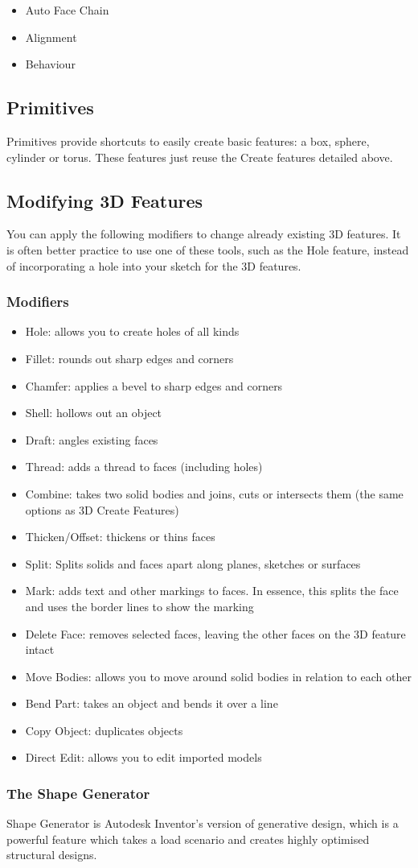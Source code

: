 \begin{itemize}
\item Auto Face Chain
\item Alignment
\item Behaviour
\end{itemize}

\subsection{Primitives}
Primitives provide shortcuts to easily create basic features: a box, sphere, cylinder or torus. These features just reuse the Create features detailed above.

\subsection{Modifying 3D Features}

You can apply the following modifiers to change already existing 3D features. It is often better practice to use one of these tools, such as the Hole feature, instead of incorporating a hole into your sketch for the 3D features.

\subsubsection{Modifiers}

\begin{itemize}
\item Hole: allows you to create holes of all kinds
\item Fillet: rounds out sharp edges and corners
\item Chamfer: applies a bevel to sharp edges and corners
\item Shell: hollows out an object
\item Draft: angles existing faces
\item Thread: adds a thread to faces (including holes)
\item Combine: takes two solid bodies and joins, cuts or intersects them (the same options as 3D Create Features)
\item Thicken/Offset: thickens or thins faces 
\item Split: Splits solids and faces apart along planes, sketches or surfaces
\item Mark: adds text and other markings to faces. In essence, this splits the face and uses the border lines to show the marking
\item Delete Face: removes selected faces, leaving the other faces on the 3D feature intact
\item Move Bodies: allows you to move around solid bodies in relation to each other
\item Bend Part: takes an object and bends it over a line
\item Copy Object: duplicates objects
\item Direct Edit: allows you to edit imported models
\end{itemize}

\subsubsection{The Shape Generator}
Shape Generator is Autodesk Inventor's version of generative design, which is a powerful feature which takes a load scenario and creates highly optimised structural designs.

